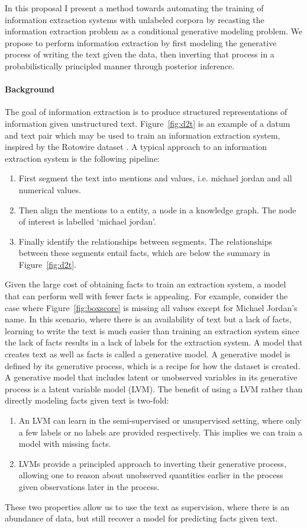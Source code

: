 \documentclass[12pt]{article}
\begin{document}
In this proposal I present a method towards automating the
training of information extraction systems with unlabeled corpora
by recasting the information extraction problem as a conditional generative modeling problem.
We propose to perform information extraction by first modeling the 
generative process of writing the text given the data,
then inverting that process in a probabilistically principled manner
through posterior inference.

\paragraph{Background}
The goal of information extraction is to produce structured representations of information
given unstructured text.
Figure~\ref{fig:d2t} is an example of a datum and text pair which may be used to
train an information extraction system, inspired by the Rotowire dataset \citep{wiseman2017d2t}.
A typical approach to an information extraction system is the following pipeline:
\begin{enumerate}
\item First segment the text into mentions and values, i.e. michael jordan and all numerical values.
\item Then align the mentions to a entity, a node in a knowledge graph.
The node of interest is labelled `michael jordan'.
\item Finally identify the relationships between segments.
The relationships between these segments entail facts, which
are below the summary in Figure~\ref{fig:d2t}.
\end{enumerate}

Given the large cost of obtaining facts to train an extraction system,
a model that can perform well with fewer facts is appealing.
For example, consider the case where Figure~\ref{fig:boxscore} is missing all values except for 
Michael Jordan's name.
In this scenario, where there is an availability of text but a lack of facts,
learning to write the text is much easier than training an extraction system
since the lack of facts results in a lack of labels for the extraction system.
A model that creates text as well as facts is called a generative model.
A generative model is defined by its generative process, which 
is a recipe for how the dataset is created.
A generative model that includes latent or unobserved variables in its generative process
is a latent variable model (LVM).
The benefit of using a LVM rather than directly modeling facts given text is two-fold:
\begin{enumerate}
\item An LVM can learn in the semi-supervised or unsupervised setting,
where only a few labels or no labels are provided respectively.
This implies we can train a model with missing facts.
\item LVMs provide a principled approach to inverting their generative process,
allowing one to reason about unobserved quantities earlier in the process given
observations later in the process. 
\end{enumerate}
These two properties allow us to use the text as supervision,
where there is an abundance of data, but still recover a model for predicting facts
given text.
\end{document}

